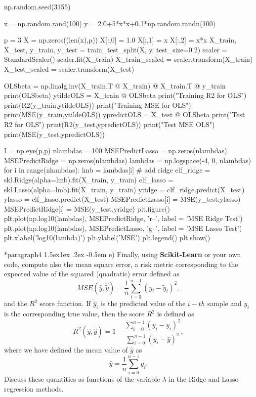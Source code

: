 \documentclass[%
oneside,                 %
final,                   %
10pt]{article}
\makeatletter
\newenvironment{doconceexercise}{}{}
\newcommand\subex{\@startsection*{paragraph}{4}{\z@}%
                  {1.5ex\@plus1ex \@minus.2ex}%
                  {-0.5em}%
                  {\normalfont\normalsize\bfseries}}
\makeatother
\begin{document}
\begin{doconceexercise}
np.random.seed(3155)

x = np.random.rand(100)
y = 2.0+5*x*x+0.1*np.random.randn(100)

p = 3
X = np.zeros((len(x),p))
X[:,0] = 1.0
X[:,1] = x
X[:,2] = x*x
X_train, X_test, y_train, y_test = train_test_split(X, y, test_size=0.2)
scaler = StandardScaler()
scaler.fit(X_train)
X_train_scaled = scaler.transform(X_train)
X_test_scaled = scaler.transform(X_test)

OLSbeta = np.linalg.inv(X_train.T @ X_train) @ X_train.T @ y_train
print(OLSbeta)
ytildeOLS = X_train @ OLSbeta
print("Training R2 for OLS")
print(R2(y_train,ytildeOLS))
print("Training MSE for OLS")
print(MSE(y_train,ytildeOLS))
ypredictOLS = X_test @ OLSbeta
print("Test R2 for OLS")
print(R2(y_test,ypredictOLS))
print("Test MSE OLS")
print(MSE(y_test,ypredictOLS))

I = np.eye(p,p)
nlambdas = 100
MSEPredictLasso = np.zeros(nlambdas)
MSEPredictRidge = np.zeros(nlambdas)
lambdas = np.logspace(-4, 0, nlambdas)
for i in range(nlambdas):
    lmb = lambdas[i]
    # add ridge
    clf_ridge = skl.Ridge(alpha=lmb).fit(X_train, y_train)
    clf_lasso = skl.Lasso(alpha=lmb).fit(X_train, y_train)
    yridge = clf_ridge.predict(X_test)
    ylasso = clf_lasso.predict(X_test)
    MSEPredictLasso[i] = MSE(y_test,ylasso)
    MSEPredictRidge[i] = MSE(y_test,yridge)
plt.figure()
plt.plot(np.log10(lambdas), MSEPredictRidge, 'r--', label = 'MSE Ridge Test')
plt.plot(np.log10(lambdas), MSEPredictLasso, 'g--', label = 'MSE Lasso Test')
plt.xlabel('log10(lambda)')
plt.ylabel('MSE')
plt.legend()
plt.show()


\subex{e)}
Finally, using \textbf{Scikit-Learn} or your own code, compute also the mean square error, a risk metric corresponding to the expected value of the squared (quadratic) error defined as
\[ MSE(\hat{y},\hat{\tilde{y}}) = \frac{1}{n}
\sum_{i=0}^{n-1}(y_i-\tilde{y}_i)^2, 
\] 
and the $R^2$ score function.
If $\tilde{\hat{y}}_i$ is the predicted value of the $i-th$ sample and $y_i$ is the corresponding true value, then the score $R^2$ is defined as
\[
R^2(\hat{y}, \tilde{\hat{y}}) = 1 - \frac{\sum_{i=0}^{n - 1} (y_i - \tilde{y}_i)^2}{\sum_{i=0}^{n - 1} (y_i - \bar{y})^2},
\]
where we have defined the mean value  of $\hat{y}$ as
\[
\bar{y} =  \frac{1}{n} \sum_{i=0}^{n - 1} y_i.
\]
Discuss these quantities as functions of the variable $\lambda$ in the Ridge and Lasso regression methods.



\end{doconceexercise}
\end{document}
